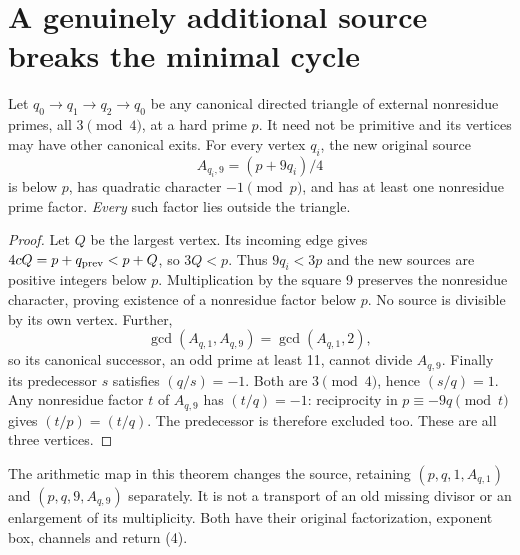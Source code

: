 \section{A genuinely additional source breaks the minimal cycle}
\begin{theorem}
\label{thm:nine}
Let $q_0\to q_1\to q_2\to q_0$ be any canonical directed triangle of external
nonresidue primes, all $3\pmod4$, at a hard prime $p$. It need not be primitive
and its vertices may have other canonical exits. For every vertex $q_i$, the
new original source
\[
 A_{q_i,9}=(p+9q_i)/4
\]
is below $p$, has quadratic character $-1\pmod p$, and has at least one
nonresidue prime factor. \emph{Every} such factor lies outside the triangle.
\end{theorem}
\begin{proof}
Let $Q$ be the largest vertex. Its incoming edge gives
$4cQ=p+q_{\rm prev}<p+Q$, so $3Q<p$. Thus $9q_i<3p$ and the new sources are
positive integers below $p$. Multiplication by the square 9 preserves the
nonresidue character, proving existence of a nonresidue factor below $p$.
No source is divisible by its own vertex. Further,
\[
 \gcd(A_{q,1},A_{q,9})=\gcd(A_{q,1},2),                 \tag{20}
\]
so its canonical successor, an odd prime at least 11, cannot divide $A_{q,9}$.
Finally its predecessor $s$ satisfies $(q/s)=-1$. Both are $3\pmod4$, hence
$(s/q)=1$. Any nonresidue factor $t$ of $A_{q,9}$ has $(t/q)=-1$: reciprocity
in $p\equiv-9q\pmod t$ gives $(t/p)=(t/q)$. The predecessor is therefore
excluded too. These are all three vertices.
\end{proof}

The arithmetic map in this theorem changes the source, retaining
$(p,q,1,A_{q,1})$ and $(p,q,9,A_{q,9})$ separately. It is not a transport of an
old missing divisor or an enlargement of its multiplicity. Both have their
original factorization, exponent box, channels and return (4).

